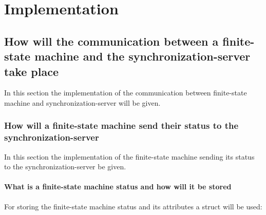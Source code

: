 \hypertarget{implementation}{%
\section{Implementation}\label{implementation}}

\hypertarget{how-will-the-communication-between-a-finite-state-machine-and-the-synchronization-server-take-place}{%
\subsection{How will the communication between a finite-state machine
and the synchronization-server take
place}\label{how-will-the-communication-between-a-finite-state-machine-and-the-synchronization-server-take-place}}

In this section the implementation of the communication between
finite-state machine and synchronization-server will be given.

\hypertarget{how-will-a-finite-state-machine-send-their-status-to-the-synchronization-server}{%
\subsubsection{How will a finite-state machine send their status to the
synchronization-server}\label{how-will-a-finite-state-machine-send-their-status-to-the-synchronization-server}}

In this section the implementation of the finite-state machine sending
its status to the synchronization-server be given.

\hypertarget{what-is-a-finite-state-machine-status-and-how-will-it-be-stored}{%
\paragraph{What is a finite-state machine status and how will it be
stored}\label{what-is-a-finite-state-machine-status-and-how-will-it-be-stored}}

For storing the finite-state machine status and its attributes a struct
will be used:

\begin{Shaded}
\begin{Highlighting}[]
 
\NormalTok{\{}

\end{Highlighting}
\end{Shaded}

